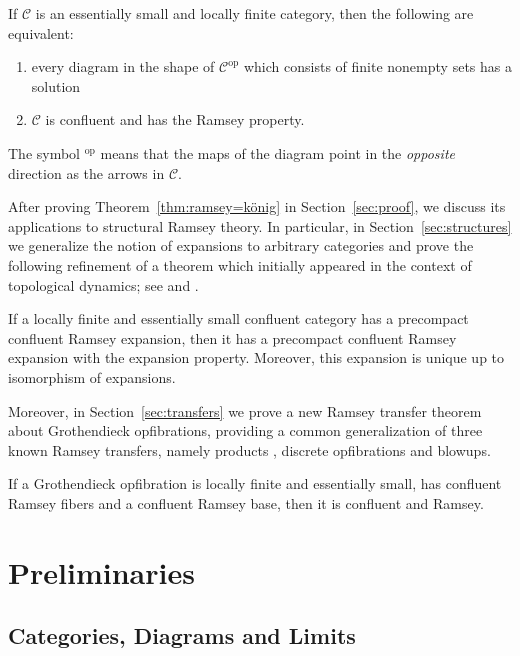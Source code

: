 \documentclass[preprint,12pt]{elsarticle}
\newcommand{\cat}[1]{\mathcal{#1}}
\newcommand{\op}{^{\mathop{op}}}
\begin{document}
\begin{thm}
\label{thm:ramsey=könig}
    If $\cat C$ is an essentially small and locally finite category, then the following are equivalent: 
\begin{enumerate}
    \item every diagram in the shape of $\cat C\op$ which consists of finite nonempty sets has a solution
    \item $\cat C$ is confluent and has the Ramsey property.
\end{enumerate}
\end{thm}

The symbol $\op$ means that the maps of the diagram point in the \emph{opposite} direction as the arrows in $\cat C$.

After proving Theorem~\ref{thm:ramsey=könig} in Section~\ref{sec:proof}, we discuss its applications to structural Ramsey theory. In particular, in Section~\ref{sec:structures} we generalize the notion of expansions to arbitrary categories and prove the following refinement of a theorem which initially appeared in the context of topological dynamics; see \cite{KPT2005} and \cite{NVT2013precompactExpansions}. 
\begin{thm}
\label{thm:introMinimal}
    If a locally finite and essentially small confluent category has a precompact confluent Ramsey expansion, then it has a precompact confluent Ramsey expansion with the expansion property. Moreover, this expansion is unique up to isomorphism of expansions.
\end{thm}
Moreover, in Section~\ref{sec:transfers} we prove a new Ramsey transfer theorem about Grothendieck opfibrations, providing a common generalization of three known Ramsey transfers, namely products \cite{sokic2012ramsey}, discrete opfibrations \cite{mavsulovic2023fibrations} and blowups.
\begin{thm}
\label{thm:introOpfibration}
    If a Grothendieck opfibration is locally finite and essentially small, has confluent Ramsey fibers and a confluent Ramsey base, then it is confluent and Ramsey.
\end{thm}






\section{Preliminaries}
\label{sec:prelim}


\subsection{Categories, Diagrams and Limits}
\end{document}
